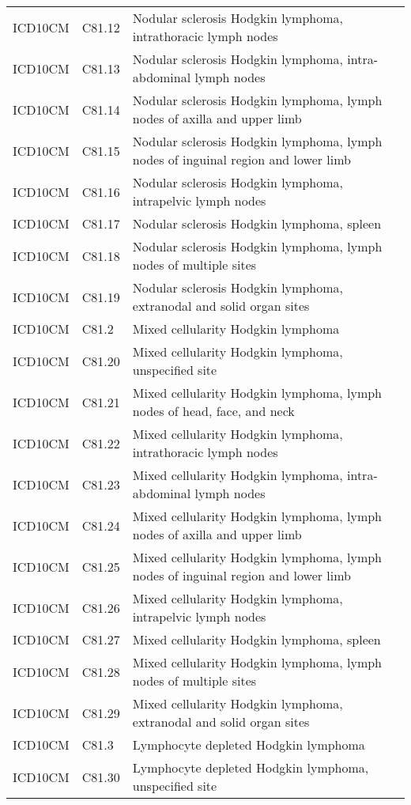 \begin{table}[ht]
\begin{tabular}{lll}
  ICD10CM & C81.12 & Nodular sclerosis Hodgkin lymphoma, intrathoracic lymph nodes \\ 
  ICD10CM & C81.13 & Nodular sclerosis Hodgkin lymphoma, intra-abdominal lymph nodes \\ 
  ICD10CM & C81.14 & Nodular sclerosis Hodgkin lymphoma, lymph nodes of axilla and upper limb \\ 
  ICD10CM & C81.15 & Nodular sclerosis Hodgkin lymphoma, lymph nodes of inguinal region and lower limb \\ 
  ICD10CM & C81.16 & Nodular sclerosis Hodgkin lymphoma, intrapelvic lymph nodes \\ 
  ICD10CM & C81.17 & Nodular sclerosis Hodgkin lymphoma, spleen \\ 
  ICD10CM & C81.18 & Nodular sclerosis Hodgkin lymphoma, lymph nodes of multiple sites \\ 
  ICD10CM & C81.19 & Nodular sclerosis Hodgkin lymphoma, extranodal and solid organ sites \\ 
  ICD10CM & C81.2 & Mixed cellularity Hodgkin lymphoma \\ 
  ICD10CM & C81.20 & Mixed cellularity Hodgkin lymphoma, unspecified site \\ 
  ICD10CM & C81.21 & Mixed cellularity Hodgkin lymphoma, lymph nodes of head, face, and neck \\ 
  ICD10CM & C81.22 & Mixed cellularity Hodgkin lymphoma, intrathoracic lymph nodes \\ 
  ICD10CM & C81.23 & Mixed cellularity Hodgkin lymphoma, intra-abdominal lymph nodes \\ 
  ICD10CM & C81.24 & Mixed cellularity Hodgkin lymphoma, lymph nodes of axilla and upper limb \\ 
  ICD10CM & C81.25 & Mixed cellularity Hodgkin lymphoma, lymph nodes of inguinal region and lower limb \\ 
  ICD10CM & C81.26 & Mixed cellularity Hodgkin lymphoma, intrapelvic lymph nodes \\ 
  ICD10CM & C81.27 & Mixed cellularity Hodgkin lymphoma, spleen \\ 
  ICD10CM & C81.28 & Mixed cellularity Hodgkin lymphoma, lymph nodes of multiple sites \\ 
  ICD10CM & C81.29 & Mixed cellularity Hodgkin lymphoma, extranodal and solid organ sites \\ 
  ICD10CM & C81.3 & Lymphocyte depleted Hodgkin lymphoma \\ 
  ICD10CM & C81.30 & Lymphocyte depleted Hodgkin lymphoma, unspecified site \\ 

\end{tabular}
\end{table}

